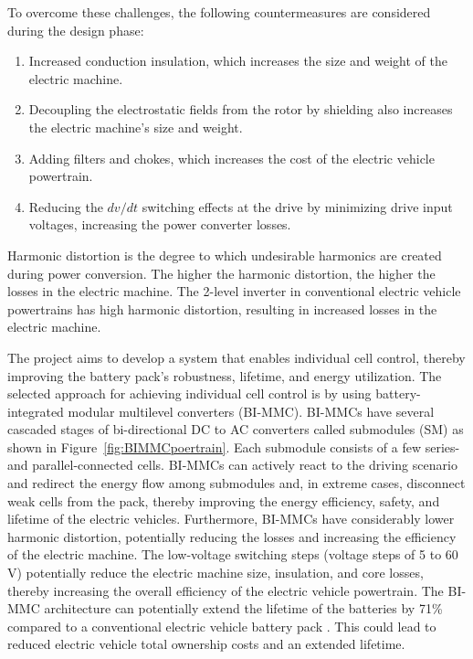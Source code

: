 \documentclass{article}
\begin{document}
To overcome these challenges, the following countermeasures are considered during the design phase:
\begin{enumerate}
    \item Increased conduction insulation, which increases the size and weight of the electric machine.
    \item Decoupling the electrostatic fields from the rotor by shielding also increases the electric machine's size and weight.
    \item Adding filters and chokes, which increases the cost of the electric vehicle powertrain.
    \item Reducing the $dv/dt$ switching effects at the drive by minimizing drive input voltages, increasing the power converter losses. 
\end{enumerate}
Harmonic distortion is the degree to which undesirable harmonics are created during power conversion. The higher the harmonic distortion, the higher the losses in the electric machine. The 2-level inverter in conventional electric vehicle powertrains has high harmonic distortion, resulting in increased losses in the electric machine. 

The project aims to develop a system that enables individual cell control, thereby improving the battery pack's robustness, lifetime, and energy utilization. The selected approach for achieving individual cell control is by using battery-integrated modular multilevel converters (BI-MMC). BI-MMCs have several cascaded stages of bi-directional DC to AC converters called submodules (SM) as shown in Figure~\ref{fig:BIMMCpoertrain}. Each submodule consists of a few series- and parallel-connected cells. BI-MMCs can actively react to the driving scenario and redirect the energy flow among submodules and, in extreme cases, disconnect weak cells from the pack, thereby improving the energy efficiency, safety, and lifetime of the electric vehicles. Furthermore, BI-MMCs have considerably lower harmonic distortion, potentially reducing the losses and increasing the efficiency of the electric machine. The low-voltage switching steps (voltage steps of 5 to 60\,V) potentially reduce the electric machine size, insulation, and core losses, thereby increasing the overall efficiency of the electric vehicle powertrain. The BI-MMC architecture can potentially extend the lifetime of the batteries by 71\% compared to a conventional electric vehicle battery pack \cite{skegro2023analysis}. This could lead to reduced electric vehicle total ownership costs and an extended lifetime.
\end{document}
